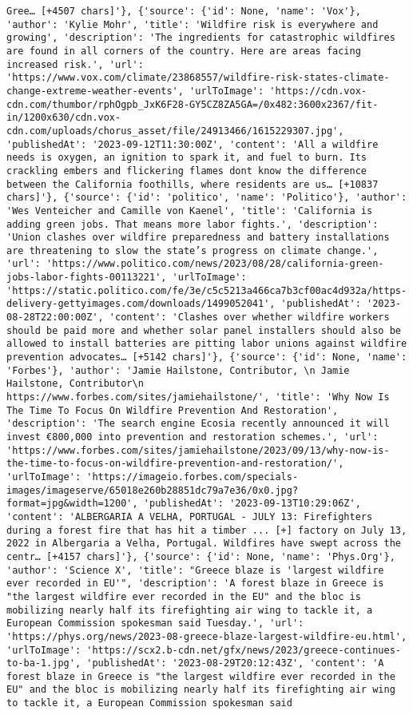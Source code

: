 \documentclass[
  letterpaper,
  DIV=11,
  numbers=noendperiod]{scrartcl}
\begin{document}
\begin{verbatim}
Gree… [+4507 chars]'}, {'source': {'id': None, 'name': 'Vox'}, 'author': 'Kylie Mohr', 'title': 'Wildfire risk is everywhere and growing', 'description': 'The ingredients for catastrophic wildfires are found in all corners of the country. Here are areas facing increased risk.', 'url': 'https://www.vox.com/climate/23868557/wildfire-risk-states-climate-change-extreme-weather-events', 'urlToImage': 'https://cdn.vox-cdn.com/thumbor/rphOgpb_JxK6F28-GY5CZ8ZA5GA=/0x482:3600x2367/fit-in/1200x630/cdn.vox-cdn.com/uploads/chorus_asset/file/24913466/1615229307.jpg', 'publishedAt': '2023-09-12T11:30:00Z', 'content': 'All a wildfire needs is oxygen, an ignition to spark it, and fuel to burn. Its crackling embers and flickering flames dont know the difference between the California foothills, where residents are us… [+10837 chars]'}, {'source': {'id': 'politico', 'name': 'Politico'}, 'author': 'Wes Venteicher and Camille von Kaenel', 'title': 'California is adding green jobs. That means more labor fights.', 'description': 'Union clashes over wildfire preparedness and battery installations are threatening to slow the state’s progress on climate change.', 'url': 'https://www.politico.com/news/2023/08/28/california-green-jobs-labor-fights-00113221', 'urlToImage': 'https://static.politico.com/fe/3e/c5c5213a466ca7b3cf00ac4d932a/https-delivery-gettyimages.com/downloads/1499052041', 'publishedAt': '2023-08-28T22:00:00Z', 'content': 'Clashes over whether wildfire workers should be paid more and whether solar panel installers should also be allowed to install batteries are pitting labor unions against wildfire prevention advocates… [+5142 chars]'}, {'source': {'id': None, 'name': 'Forbes'}, 'author': 'Jamie Hailstone, Contributor, \n Jamie Hailstone, Contributor\n https://www.forbes.com/sites/jamiehailstone/', 'title': 'Why Now Is The Time To Focus On Wildfire Prevention And Restoration', 'description': 'The search engine Ecosia recently announced it will invest €800,000 into prevention and restoration schemes.', 'url': 'https://www.forbes.com/sites/jamiehailstone/2023/09/13/why-now-is-the-time-to-focus-on-wildfire-prevention-and-restoration/', 'urlToImage': 'https://imageio.forbes.com/specials-images/imageserve/65018e260b28851dc79a7e36/0x0.jpg?format=jpg&width=1200', 'publishedAt': '2023-09-13T10:29:06Z', 'content': 'ALBERGARIA A VELHA, PORTUGAL - JULY 13: Firefighters during a forest fire that has hit a timber ... [+] factory on July 13, 2022 in Albergaria a Velha, Portugal. Wildfires have swept across the centr… [+4157 chars]'}, {'source': {'id': None, 'name': 'Phys.Org'}, 'author': 'Science X', 'title': "Greece blaze is 'largest wildfire ever recorded in EU'", 'description': 'A forest blaze in Greece is "the largest wildfire ever recorded in the EU" and the bloc is mobilizing nearly half its firefighting air wing to tackle it, a European Commission spokesman said Tuesday.', 'url': 'https://phys.org/news/2023-08-greece-blaze-largest-wildfire-eu.html', 'urlToImage': 'https://scx2.b-cdn.net/gfx/news/2023/greece-continues-to-ba-1.jpg', 'publishedAt': '2023-08-29T20:12:43Z', 'content': 'A forest blaze in Greece is "the largest wildfire ever recorded in the EU" and the bloc is mobilizing nearly half its firefighting air wing to tackle it, a European Commission spokesman said 
\end{verbatim}
\end{document}
